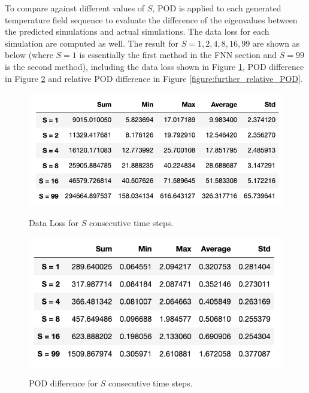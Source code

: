 To compare against different values of $S$, POD is applied to each generated temperature field sequence to evaluate the difference of the eigenvalues between the predicted simulations and actual simulations. The data loss for each simulation are computed as well. The result for $S = 1, 2, 4, 8, 16, 99$ are shown as below (where $S=1$ is essentially the first method in the FNN section and $S=99$ is the second method), including the data loss shown in Figure \ref{figure:further_loss}, POD difference in Figure \ref{figure:further_POD} and relative POD difference in Figure \ref{figure:further_relative_POD}.

\begin{figure}[H]
    \caption{Data Loss for $S$ consecutive time steps.}
    \includegraphics[scale=0.7]{figures/mantle_convection_images/further_testings/Data_Loss_table.png}
    \label{figure:further_loss}
\end{figure}

\begin{figure}[H]
    \caption{POD difference for $S$ consecutive time steps.}
    \includegraphics[scale=0.7]{figures/mantle_convection_images/further_testings/POD_table.png}
    \label{figure:further_POD}
\end{figure}

